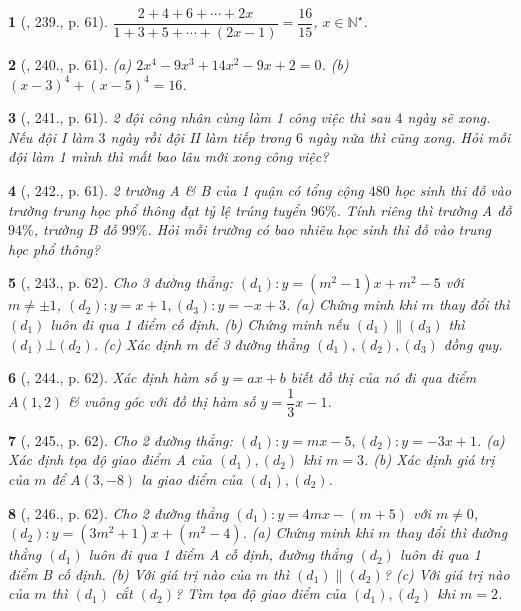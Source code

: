 \documentclass{article}
\newtheorem{baitoan}{}
\begin{document}
\begin{baitoan}[\cite{Tuyen_Toan_8}, 239., p. 61]
	$\dfrac{2 + 4 + 6 + \cdots + 2x}{1 + 3 + 5 + \cdots + (2x - 1)} = \dfrac{16}{15}$, $x\in\mathbb{N}^\star$.
\end{baitoan}

\begin{baitoan}[\cite{Tuyen_Toan_8}, 240., p. 61]
	(a) $2x^4 - 9x^3 + 14x^2 - 9x + 2 = 0$. (b) $(x - 3)^4 + (x - 5)^4 = 16$.
\end{baitoan}

\begin{baitoan}[\cite{Tuyen_Toan_8}, 241., p. 61]
	2 đội công nhân cùng làm 1 công việc thì sau $4$ ngày sẽ xong. Nếu đội I làm $3$ ngày rồi đội II làm tiếp trong $6$ ngày nữa thì cũng xong. Hỏi mỗi đội làm 1 mình thì mất bao lâu mới xong công việc?
\end{baitoan}

\begin{baitoan}[\cite{Tuyen_Toan_8}, 242., p. 61]
	2 trường A \& B của 1 quận có tổng cộng $480$ học sinh thi đỗ vào trường trung học phổ thông đạt tỷ lệ trúng tuyển $96\%$. Tính riêng thì trường A đỗ $94\%$, trường B đỗ $99\%$. Hỏi mỗi trường có bao nhiêu học sinh thi đỗ vào trung học phổ thông?
\end{baitoan}

\begin{baitoan}[\cite{Tuyen_Toan_8}, 243., p. 62]
	Cho 3 đường thẳng: $(d_1):y = (m^2 - 1)x + m^2 - 5$ với $m\ne\pm1$, $(d_2):y = x + 1,(d_3):y = -x + 3$. (a) Chứng minh khi $m$ thay đổi thì $(d_1)$ luôn đi qua 1 điểm cố định. (b) Chứng minh nếu $(d_1)\parallel(d_3)$ thì $(d_1)\bot(d_2)$. (c) Xác định $m$ để 3 đường thẳng $(d_1),(d_2),(d_3)$ đồng quy.
\end{baitoan}

\begin{baitoan}[\cite{Tuyen_Toan_8}, 244., p. 62]
	Xác định hàm số $y = ax + b$ biết đồ thị của nó đi qua điểm $A(1,2)$ \& vuông góc với đồ thị hàm số $y = \dfrac{1}{3}x - 1$.
\end{baitoan}

\begin{baitoan}[\cite{Tuyen_Toan_8}, 245., p. 62]
	Cho 2 đường thẳng: $(d_1):y = mx - 5,(d_2):y = -3x + 1$. (a) Xác định tọa độ giao điểm A của $(d_1),(d_2)$ khi $m = 3$. (b) Xác định giá trị của $m$ để $A(3,-8)$ la giao điểm của $(d_1),(d_2)$.
\end{baitoan}

\begin{baitoan}[\cite{Tuyen_Toan_8}, 246., p. 62]
	Cho 2 đường thẳng $(d_1):y = 4mx - (m + 5)$ với $m\ne0$, $(d_2):y = (3m^2 + 1)x + (m^2 - 4)$. (a) Chứng minh khi $m$ thay đổi thì đường thẳng $(d_1)$ luôn đi qua 1 điểm A cố định, đường thẳng $(d_2)$ luôn đi qua 1 điểm B cố định. (b) Với giá trị nào của $m$ thì $(d_1)\parallel(d_2)$? (c) Với giá trị nào của $m$ thì $(d_1)$ cắt $(d_2)$? Tìm tọa độ giao điểm của $(d_1),(d_2)$ khi $m = 2$.
\end{baitoan}
\end{document}
